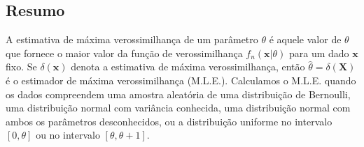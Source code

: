 \subsection*{Resumo}
A estimativa de máxima verossimilhança de um parâmetro $\theta$ é aquele valor de $\theta$ que fornece o maior valor da função de verossimilhança $f_n(\textbf{x}|\theta)$ para um dado $\textbf{x}$ fixo. Se $\delta(\textbf{x})$ denota a estimativa de máxima verossimilhança, então $\hat{\theta} = \delta(\textbf{X})$ é o estimador de máxima verossimilhança (M.L.E.). Calculamos o M.L.E. quando os dados compreendem uma amostra aleatória de uma distribuição de Bernoulli, uma distribuição normal com variância conhecida, uma distribuição normal com ambos os parâmetros desconhecidos, ou a distribuição uniforme no intervalo $[0, \theta]$ ou no intervalo $[\theta, \theta+1]$.

